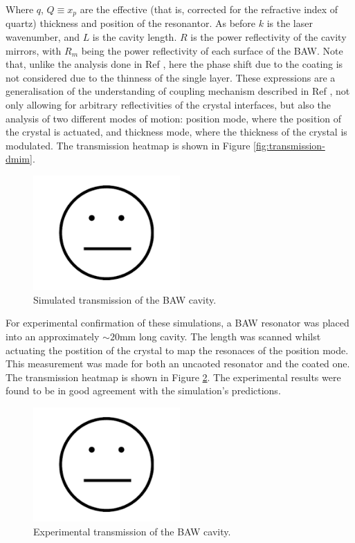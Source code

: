 \documentclass[aps,  
                a4paper, 
                amsmath, 
                amssymb, 
                preprint,
                tightenlines,  
                amsfonts,
                nofootinbib,
                onecolumn,
                titlepage,
                10pt
            ]{revtex4-2}
\begin{document}
    Where $q$, $Q\equiv x_p$ are the effective (that is, corrected for the refractive index of quartz) thickness and position of the resonantor. As before $k$ is the laser wavenumber, and $L$ is the cavity length. $R$ is the power reflectivity of the cavity mirrors, with $R_m$ being the power reflectivity of each surface of the BAW. Note that, unlike the analysis done in Ref \cite{li2016}, here the phase shift due to the coating is not considered due to the thinness of the single layer. These expressions are a generalisation of the understanding of coupling mechanism described in Ref \cite{page2021}, not only allowing for arbitrary reflectivities of the crystal interfaces, but also the analysis of two different modes of motion: position mode, where the position of the crystal is actuated, and thickness mode, where the thickness of the crystal is modulated. The transmission heatmap is shown in Figure \ref{fig:transmission-dmim}. 
    \begin{figure}
        \centering
        \includegraphics[width=0.5\textwidth]{img/blank.png}
        \caption{Simulated transmission of the BAW cavity.}
        \label{fig:sim-transmission-dmim}
    \end{figure}
    \par
    For experimental confirmation of these simulations, a BAW resonator was placed into an approximately $\sim20$mm long cavity. The length was scanned whilst actuating the postition of the crystal to map the resonaces of the position mode. This measurement was made for both an uncaoted resonator and the coated one. The transmission heatmap is shown in Figure \ref{fig:exp-transmission-dmim}. The experimental results were found to be in good agreement with the simulation's predictions.
    \begin{figure}
        \centering
        \includegraphics[width=0.5\textwidth]{img/blank.png}
        \caption{Experimental transmission of the BAW cavity.}
        \label{fig:exp-transmission-dmim}
    \end{figure}
\end{document}
